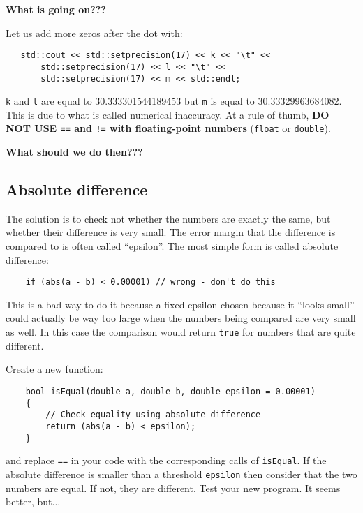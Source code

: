 \documentclass[english,a4paper,12pt,oneside]{article}
\begin{document}
\begin{center}{\bf What is going on???}\end{center}

Let us add more zeros after the dot with:
\begin{lstlisting}
   std::cout << std::setprecision(17) << k << "\t" <<
       std::setprecision(17) << l << "\t" <<
       std::setprecision(17) << m << std::endl;
\end{lstlisting}

\verb+k+ and \verb+l+ are equal to 30.333301544189453 but \verb+m+ is equal to 30.33329963684082. 
This is due to what is called numerical inaccuracy. 
At a rule of thumb, {\bf\large DO NOT USE \verb+==+ and \verb+!=+ with floating-point numbers} (\verb+float+ or \verb+double+). 

\begin{center}{\bf What should we do then???}\end{center}


\subsection*{Absolute difference}


The solution is to check not whether the numbers are exactly the same, but whether their difference is very small. 
The error margin that the difference is compared to is often called ``epsilon''. The most simple form is called absolute difference:

\begin{lstlisting}
    if (abs(a - b) < 0.00001) // wrong - don't do this
\end{lstlisting}

This is a bad way to do it because a fixed epsilon chosen because it ``looks small'' could actually be way too large when the numbers being compared are very small as well. 
In this case the comparison would return \verb+true+ for numbers that are quite different. 

Create a new function:
\begin{lstlisting}
    bool isEqual(double a, double b, double epsilon = 0.00001)
    {
        // Check equality using absolute difference
        return (abs(a - b) < epsilon);
    }
\end{lstlisting}
and replace \verb+==+ in your code with the corresponding calls of \verb+isEqual+. 
If the absolute difference is smaller than a threshold \verb+epsilon+ then consider that the two numbers are equal. 
If not, they are different. 
Test your new program. 
It seems better, but...
\end{document}
